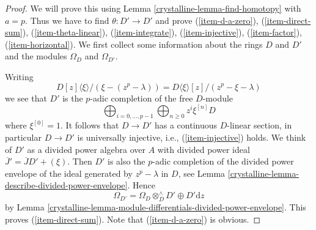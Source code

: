 \begin{proof}

We will prove this using Lemma \ref{crystalline-lemma-find-homotopy} with $a = p$.
Thus we have to find $\theta : D' \to D'$ and prove
(\ref{item-d-a-zero}), (\ref{item-direct-sum}), (\ref{item-theta-linear}),
(\ref{item-integrate}), (\ref{item-injective}), (\ref{item-factor}),
(\ref{item-horizontal}). We first collect some information about the rings
$D$ and $D'$ and the modules $\Omega_D$ and $\Omega_{D'}$.

\medskip\noindent
Writing
$$
D[z]\langle \xi \rangle/(\xi - (z^p - \lambda))
=
D\langle \xi \rangle[z]/(z^p - \xi - \lambda)
$$
we see that $D'$ is the $p$-adic completion of the free $D$-module
$$
\bigoplus\nolimits_{i = 0, \ldots, p - 1}
\bigoplus\nolimits_{n \geq 0}
z^i \xi^{[n]} D
$$
where $\xi^{[0]} = 1$.
It follows that $D \to D'$ has a continuous $D$-linear section, in particular
$D \to D'$ is universally injective, i.e., (\ref{item-injective}) holds.
We think of $D'$ as a divided power algebra
over $A$ with divided power ideal $\overline{J}' = \overline{J}D' + (\xi)$.
Then $D'$ is also the $p$-adic completion of the divided power envelope
of the ideal generated by $z^p - \lambda$ in $D$, see
Lemma \ref{crystalline-lemma-describe-divided-power-envelope}. Hence
$$
\Omega_{D'} = \Omega_D \otimes_D^\wedge D' \oplus D'\text{d}z
$$
by Lemma \ref{crystalline-lemma-module-differentials-divided-power-envelope}.
This proves (\ref{item-direct-sum}). Note that (\ref{item-d-a-zero})
is obvious.


\end{proof}
